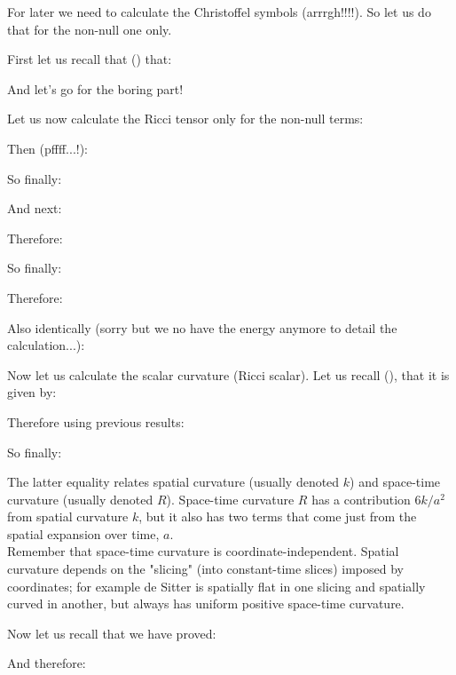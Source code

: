 	For later we need to calculate the Christoffel symbols (arrrgh!!!!). So let us do that for the non-null one only.

	First let us recall that () that:
	
	And let's go for the boring part!
	
	
	
	
	
	
	
	
	
	
	
	
	
	
	
	
	Let us now calculate the Ricci tensor only for the non-null terms:
	
	Then (pffff...!):
	
	So finally:
	
	And next:
	
	Therefore:
	
	So finally:
	
	
	Therefore:
	
	Also identically (sorry but we no have the energy anymore to detail the calculation...):
	
	Now let us calculate the scalar curvature (Ricci scalar). Let us recall (), that it is given by:
	
	Therefore using previous results:
	
	So finally:
	
	\begin{tcolorbox}[title=Remark,colframe=black,arc=10pt]
	The latter equality relates spatial curvature (usually denoted $k$) and space-time curvature (usually denoted $R$). Space-time curvature $R$ has a contribution $6k/a^2$ from spatial curvature $k$, but it also has two terms that come just from the spatial expansion over time, $a$.\\ 
	
	Remember that space-time curvature is coordinate-independent. Spatial curvature depends on the "slicing" (into constant-time slices) imposed by coordinates; for example de Sitter is spatially flat in one slicing and spatially curved in another, but always has uniform positive space-time curvature.
	\end{tcolorbox}
	
	Now let us recall that we have proved:
	
	And therefore:
	
